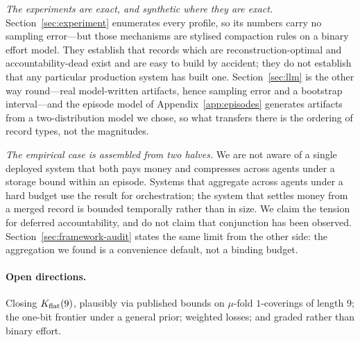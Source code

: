 \emph{The experiments are exact, and synthetic where they are exact.}
Section~\ref{sec:experiment} enumerates every profile, so its numbers carry no
sampling error---but those mechanisms are stylised compaction rules on a binary
effort model. They establish that records which are reconstruction-optimal and
accountability-dead exist and are easy to build by accident; they do not
establish that any particular production system has built one.
Section~\ref{sec:llm} is the other way round---real model-written artifacts,
hence sampling error and a bootstrap interval---and the episode model of
Appendix~\ref{app:episodes} generates artifacts from a two-distribution model we
chose, so what transfers there is the ordering of record types, not the
magnitudes.

\emph{The empirical case is assembled from two halves.} We are not aware of a
single deployed system that both pays money and compresses across agents under a
storage bound within an episode. Systems that aggregate across agents under a
hard budget use the result for orchestration; the system that settles money from
a merged record is bounded temporally rather than in size. We claim the tension
for deferred accountability, and do not claim that conjunction has been observed.
Section~\ref{sec:framework-audit} states the same limit from the other side: the
aggregation we found is a convenience default, not a binding budget.

\paragraph{Open directions.}
Closing $K_{\mathrm{flat}}(9)$, plausibly via published bounds on $\mu$-fold $1$-coverings
of length $9$; the one-bit frontier under a general prior; weighted losses; and
graded rather than binary effort.
